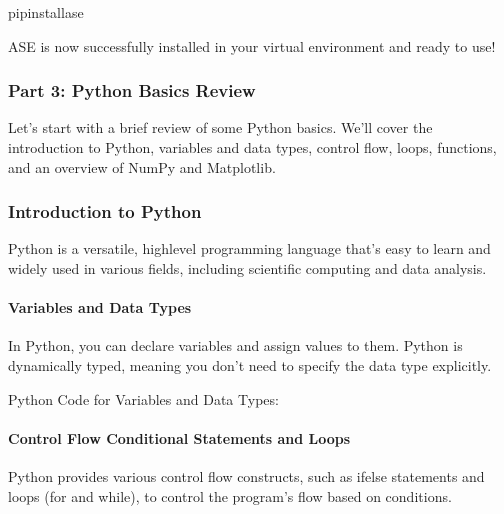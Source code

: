 \documentclass[letterpaper,10pt,english]{sphinxmanual}
\begin{document}
\begin{sphinxVerbatim}[commandchars=\\\{\}]
pipinstallase
\end{sphinxVerbatim}

\sphinxAtStartPar
ASE is now successfully installed in your virtual environment and ready to use!


\subsubsection{Part 3: Python Basics Review}
\label{\detokenize{basics/basics:part-3-python-basics-review}}
\sphinxAtStartPar
Let’s start with a brief review of some Python basics. We’ll cover the introduction to Python, variables and data types, control flow, loops, functions, and an overview of NumPy and Matplotlib.


\subsubsection{Introduction to Python}
\label{\detokenize{basics/basics:introduction-to-python}}
\sphinxAtStartPar
Python is a versatile, high\sphinxhyphen{}level programming language that’s easy to learn and widely used in various fields, including scientific computing and data analysis.


\paragraph{Variables and Data Types}
\label{\detokenize{basics/basics:variables-and-data-types}}
\sphinxAtStartPar
In Python, you can declare variables and assign values to them. Python is dynamically typed, meaning you don’t need to specify the data type explicitly.

\sphinxAtStartPar
Python Code for Variables and Data Types:

\begin{sphinxVerbatim}[commandchars=\\\{\}]
  
  
  
  
\end{sphinxVerbatim}


\paragraph{Control Flow \sphinxhyphen{} Conditional Statements and Loops}
\label{\detokenize{basics/basics:control-flow-conditional-statements-and-loops}}
\sphinxAtStartPar
Python provides various control flow constructs, such as if\sphinxhyphen{}else statements and loops (for and while), to control the program’s flow based on conditions.
\end{document}
